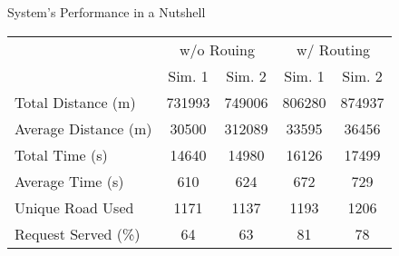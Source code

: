 \begin{frame}{System's Performance in a Nutshell}
	\begin{table}[h]
		\centering
		\begin{tabular}{ |p{3.7cm}|c|c|c|c|}
			\cline{2-5}
			\multicolumn{1}{c}{}&\multicolumn{2}{|c|}{w/o Rouing} &\multicolumn{2}{|c|}{w/ Routing}\\
			\cline{2-5}
			\multicolumn{1}{c|}{}& Sim. 1 & Sim. 2 & Sim. 1 & Sim. 2\\
			\hline
			Total Distance (m) &731993& 749006& 806280&874937\\
			Average Distance (m) &30500 & 312089 &33595&36456\\
			Total Time (s) &14640& 14980 &16126&17499\\
			Average Time (s) & 610& 624 &672&729\\
			Unique Road Used &1171&1137 &1193&1206\\
			Request Served (\%)&64 & 63 &81&78\\
		\end{tabular}
	\end{table}
\end{frame}

